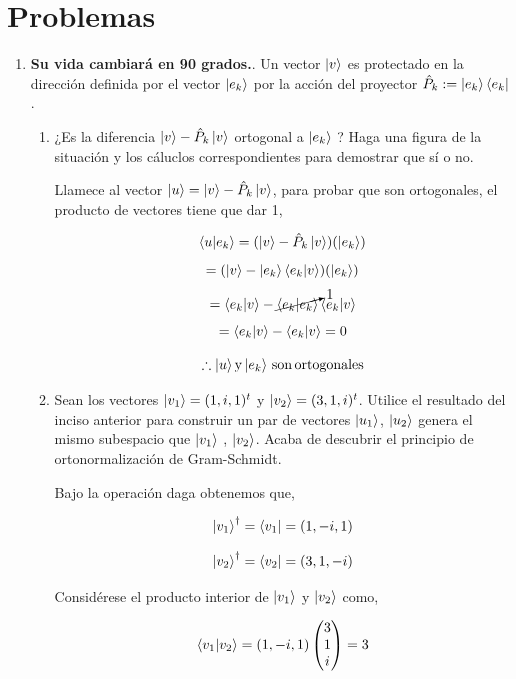 \documentclass[12pt,a4paper]{article}
\begin{document}
\section*{Problemas}

\begin{enumerate}
\item \textbf{Su vida cambiará en 90 grados.}. Un vector $ \ket{v} $ es protectado en la dirección definida por el vector $ \ket{e_{k}} $ por la acción del proyector $ \hat{P}_{k} := \ket{e_{k}} \bra{e_{k}} $.

\begin{enumerate}
\item ¿Es la diferencia $ \ket{v} - \hat{P}_{k} \ket{v} $ ortogonal a $ \ket{e_{k}} $ ? Haga una figura de la situación y los cáluclos correspondientes para demostrar que sí o no.

Llamece al vector $ \ket{u} = \ket{v} - \hat{P}_{k} \ket{v} $, para probar que son ortogonales, el producto de vectores tiene que dar 1,


\[
\braket{u|e_{k}} = (\ket{v} - \hat{P}_{k} \ket{v})(\ket{e_{k}})
\]
\[
= (\ket{v} -  \ket{e_{k}} \braket{e_{k}|v})(\ket{e_{k}})
\]
\[
= \braket{e_{k}|v} -  \cancelto{1}{\braket{e_{k}|e_{k}}} \braket{e_{k}|v}
\]
\[
= \braket{e_{k}|v} - \braket{e_{k}|v} = 0
\]


\[
\therefore \ket{u} \mathrm{y} \ket{e_{k}} \, \mathrm{son} \, \mathrm{ortogonales}
\]

\item Sean los vectores $ \ket{v_{1}} = (1, i, 1)^t $ y $ \ket{v_{2}} = (3, 1, i)^t$. Utilice el resultado del inciso anterior para construir un par de vectores $ \ket{u_{1}} $, $ \ket{u_{2}} $ genera el mismo subespacio que $ \ket{v_{1}} $ , $ \ket{v_{2}} $. Acaba de descubrir el principio de ortonormalización de Gram-Schmidt.

Bajo la operación daga obtenemos que,


\[
\ket{v_{1}}^{\dagger} = \bra{v_{1}} = (1, -i, 1)
\]

\[
\ket{v_{2}}^{\dagger} = \bra{v_{2}} = (3, 1, -i)
\]

Considérese el producto interior de $ \ket{v_{1}} $ y $ \ket{v_{2}} $ como,

\[
\braket{v_{1}|v_{2}} = (1, -i, 1) \begin{pmatrix}
3 \\
1 \\
i \\  
\end{pmatrix} = 3
\]


\end{enumerate}
\end{enumerate}
\end{document}
